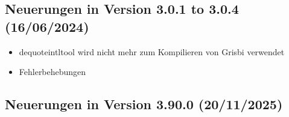 \subsection{Neuerungen in Version 3.0.1 to 3.0.4 \textnormal{(16/06/2024)}}

\begin{itemize}
	\item dequote{intltool} wird nicht mehr zum Kompilieren von Grisbi verwendet
	\item Fehlerbehebungen
\end{itemize}

\subsection{Neuerungen in Version 3.90.0 \textnormal{(20/11/2025)}}

